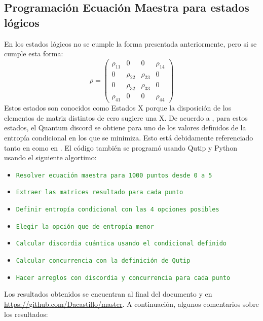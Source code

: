 \documentclass{book}
\begin{document}
\subsection{{Programación Ecuación Maestra para estados lógicos}}
En los estados lógicos no se cumple la forma presentada anteriormente, pero si se cumple esta forma:
\begin{equation}{\rho=\begin{pmatrix} \rho_{11} & 0 & 0 & \rho_{14} \\ 0 & \rho_{22} & \rho_{23}
 & 0 \\ 0 & \rho_{32} & \rho_{33} & 0 \\ \rho_{41} & 0 & 0 & \rho_{44}\end{pmatrix}}\end{equation}
 Estos estados son conocidos como {Estados X} porque la disposición de los elementos de matriz distintos de cero sugiere una X.  De acuerdo a \cite{Ali}, para estos estados, el Quantum discord se obtiene para uno de los valores definidos de la entropía condicional en los que se minimiza. Esto está debidamente referenciado tanto en \cite{Ali} como en \cite{Results}.
El código también se programó usando Qutip y Python usando el siguiente algortimo:
\begin{itemize}
\item\textcolor{ForestGreen}{\texttt{Resolver ecuación maestra para 1000 puntos desde 0 a 5}}
\item\textcolor{ForestGreen}{\texttt{Extraer las matrices resultado para cada punto}}
\item\textcolor{ForestGreen}{\texttt{Definir entropía condicional con las 4 opciones posibles}}
\item\textcolor{ForestGreen}{\texttt{Elegir la opción que de entropía menor}}
\item\textcolor{ForestGreen}{\texttt{Calcular discordia cuántica usando el condicional definido}}
\item\textcolor{ForestGreen}{\texttt{Calcular concurrencia con la definición de Qutip}}
\item\textcolor{ForestGreen}{\texttt{Hacer arreglos con discordia y concurrencia para cada punto}}
\end{itemize}
Los resultados obtenidos se encuentran al final del documento y en \textcolor{ForestGreen}{\url{https://github.com/Dacastillo/master}}. 
 A continuación, algunos comentarios sobre los resultados:
\end{document}
